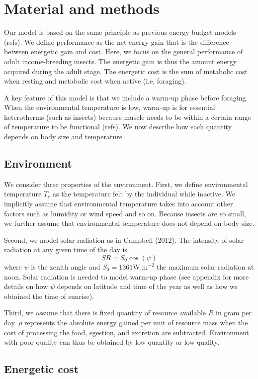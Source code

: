 \section*{Material and methods}
Our model is based on the same principle as previous energy budget models (refs).
We define performance as the net energy gain that is the difference between energetic gain and cost.
Here, we focus on the general performance of adult income-breeding insects. 
The energetic gain is thus the amount energy acquired during the adult stage.
The energetic cost is the sum of metabolic cost when resting and metabolic cost when active (i.e, foraging).

A key feature of this model is that we include a warm-up phase before foraging.
When the environmental temperature is low, warm-up is for essential heterotherms (such as insects) because muscle needs to be within a certain range of temperature to be functional (refs).
We now describe how each quantity depends on body size and temperature.

\subsection*{Environment}
We consider three properties of the environment. 
First, we define environmental temperature $T_e$ as the temperature felt by the individual while inactive.
We implicitly assume that environmental temperature takes into account other factors such as humidity or wind speed and so on.
Because insects are so small, we further assume that environmental temperature does not depend on body size.

Second, we model solar radiation as in Campbell (2012).
The intensity of solar radiation at any given time of the day is \[SR = S_0 \cos(\psi) \]
where $\psi$ is the zenith angle and $S_0 = 1361 \mbox{W.m}^{-2}$ the maximum solar radiation at noon.
Solar radiation is needed to model warm-up phase (see appendix for more details on how $\psi$ depends on latitude and time of the year as well as how we obtained the time of sunrise).

Third, we assume that there is fixed quantity of resource available $R$ in gram per day.
$\rho$ represents the absolute energy gained per unit of resource mass when the cost of processing the food, egestion, and excretion are subtracted. 
Environment with poor quality can thus be obtained by low quantity or low quality.

\subsection*{Energetic cost}
